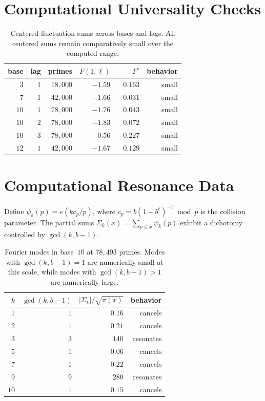 \documentclass[12pt]{amsart}
\theoremstyle{definition}
\theoremstyle{remark}
\begin{document}
\section{Computational Universality Checks}

\begin{table}[h]
\centering
\begin{tabular}{rrrrrr}
\toprule
base & lag & primes & $F(1,\ell)$ & $F^{\circ}$ & behavior \\
\midrule
$3$ & $1$ & $18{,}000$ & $-1.59$ & $0.163$ & small \\
$7$ & $1$ & $42{,}000$ & $-1.66$ & $0.031$ & small \\
$10$ & $1$ & $78{,}000$ & $-1.76$ & $0.043$ & small \\
$10$ & $2$ & $78{,}000$ & $-1.83$ & $0.072$ & small \\
$10$ & $3$ & $78{,}000$ & $-0.56$ & $-0.227$ & small \\
$12$ & $1$ & $42{,}000$ & $-1.67$ & $0.129$ & small \\
\bottomrule
\end{tabular}
\caption{Centered fluctuation sums across bases and lags.
All centered sums remain comparatively small over the computed
range.}
\label{tab:universal}
\end{table}

\section{Computational Resonance Data}

Define $\psi_k(p) = e(kc_p/p)$, where
$c_p = b(1 - b^{\ell})^{-1} \bmod p$ is the collision
parameter. The partial sums
$\Sigma_k(x) = \sum_{p \le x} \psi_k(p)$ exhibit a
dichotomy controlled by $\gcd(k, b{-}1)$.

\begin{table}[h]
\centering
\begin{tabular}{rrrr}
\toprule
$k$ & $\gcd(k, b{-}1)$ & $|\Sigma_k| / \sqrt{\pi(x)}$
& behavior \\
\midrule
$1$ & $1$ & $0.16$ & cancels \\
$2$ & $1$ & $0.21$ & cancels \\
$3$ & $3$ & $140$ & resonates \\
$5$ & $1$ & $0.06$ & cancels \\
$7$ & $1$ & $0.22$ & cancels \\
$9$ & $9$ & $280$ & resonates \\
$10$ & $1$ & $0.15$ & cancels \\
\bottomrule
\end{tabular}
\caption{Fourier modes in base~$10$ at $78{,}493$ primes.
Modes with $\gcd(k, b{-}1) = 1$ are numerically small at this
scale, while modes with $\gcd(k, b{-}1) > 1$ are numerically
large.}
\label{tab:resonance}
\end{table}
\end{document}
